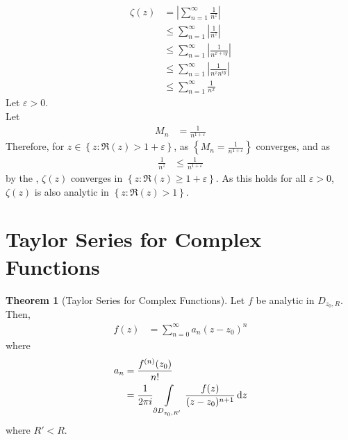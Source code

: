 \documentclass[titlepage, fleqn, a4paper, 12pt, twoside]{article}
\theoremstyle{definition}
\theoremstyle{theorem}
\newtheorem{theorem}{Theorem}
\begin{document}
\begin{solution}
	\begin{align*}
		\zeta(z) & = \left| \sum\limits_{n = 1}^{\infty} \frac{1}{n^z} \right|           \\
                         & \le \sum\limits_{n = 1}^{\infty} \left| \frac{1}{n^z} \right|         \\
                         & \le \sum\limits_{n = 1}^{\infty} \left| \frac{1}{n^{x + i y}} \right| \\
                         & \le \sum\limits_{n = 1}^{\infty} \left| \frac{1}{n^x n^{i y}} \right| \\
                         & \le \sum\limits_{n = 1}^{\infty} \frac{1}{n^x}
	\end{align*}
	Let $\varepsilon > 0$.\\
	Let
	\begin{align*}
		M_n & = \frac{1}{n^{1 + \varepsilon}}
	\end{align*}
	Therefore, for $z \in \left\{ z : \Re(z) > 1 + \varepsilon \right\}$, as $\left\{ M_n = \frac{1}{n^{1 + \varepsilon}} \right\}$ converges, and as
	\begin{align*}
		\frac{1}{n^z} & \le \frac{1}{n^{1 + \varepsilon}}
	\end{align*}
	by the , $\zeta(z)$ converges in $\left\{ z : \Re(z) \ge 1 + \varepsilon \right\}$.
	As this holds for all $\varepsilon > 0$, $\zeta(z)$ is also analytic in $\left\{ z : \Re(z) > 1 \right\}$.
\end{solution}

\section{Taylor Series for Complex Functions}

\begin{theorem}[Taylor Series for Complex Functions]
	Let $f$ be analytic in $D_{z_0,R}$.
	Then,
	\begin{align*}
		f(z) & = \sum\limits_{n = 0}^{\infty} a_n (z - z_0)^n
	\end{align*}
	where
	\begin{align*}
		a_n & = \frac{f^{(n)}(z_0)}{n!} \\
                    & = \frac{1}{2 \pi i} \int\limits_{\partial D_{z_0,R'}} \frac{f(z)}{(z - z_0)^{n + 1}} \dif z
	\end{align*}
	where $R' < R$.
	\label{thm:Taylor_Series_for_Complex_Functions}
\end{theorem}
\end{document}
